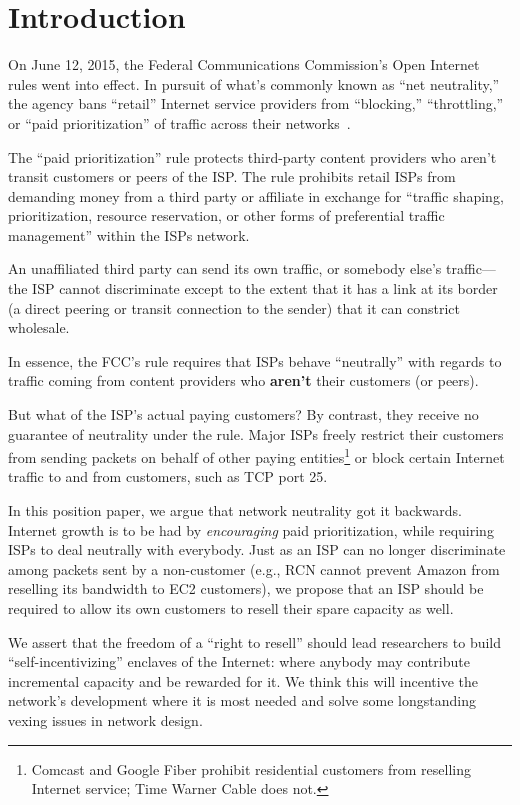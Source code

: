 \section{Introduction}

\label{sec:intro}

On June 12, 2015, the Federal Communications Commission's Open
Internet rules went into effect. In pursuit of what's commonly known
as ``net neutrality,'' the agency bans ``retail'' Internet service
providers from ``blocking,'' ``throttling,'' or ``paid
prioritization'' of traffic across their networks~\cite{openinternet}.

The ``paid prioritization'' rule protects third-party
content providers who aren't transit customers or peers of the
ISP. The rule prohibits retail ISPs from demanding money from a third
party or affiliate in exchange for ``traffic shaping, prioritization,
resource reservation, or other forms of preferential traffic
management'' within the ISPs network.

An unaffiliated third party can send its own traffic, or somebody
else's traffic---the ISP cannot discriminate except to the extent that
it has a link at its border (a direct peering or transit connection to
the sender) that it can constrict wholesale.

In essence, the FCC's rule requires that ISPs behave ``neutrally''
with regards to traffic coming from content providers who
\textbf{aren't} their customers (or peers).

But what of the ISP's actual paying customers? By contrast, they
receive no guarantee of neutrality under the rule. Major ISPs freely
restrict their customers from sending packets on behalf of other
paying entities\footnote{Comcast and Google Fiber prohibit residential
  customers from reselling Internet service; Time Warner Cable does
  not.} or block certain Internet traffic to and from
customers, such as TCP port 25.

In this position paper, we argue that network neutrality got it
backwards. Internet growth is to be had by \emph{encouraging} paid
prioritization, while requiring ISPs to deal neutrally with
everybody. Just as an ISP can no longer discriminate among packets
sent by a non-customer (e.g., RCN cannot prevent Amazon from reselling
its bandwidth to EC2 customers), we propose that an ISP should be
required to allow its own customers to resell their spare capacity as
well.

We assert that the freedom of a ``right to resell'' should lead
researchers to build ``self-incentivizing'' enclaves of the Internet:
where anybody may contribute incremental capacity and be rewarded for
it. We think this will incentive the network's development where it is
most needed and solve some longstanding vexing issues in network
design.

